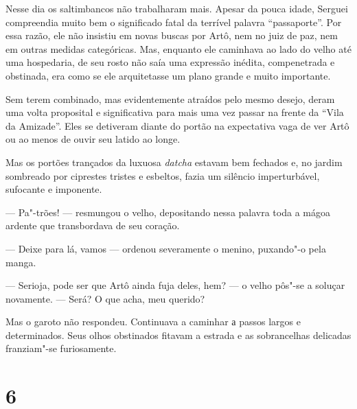 Nesse dia os saltimbancos não trabalharam mais. Apesar da pouca idade,
Serguei compreendia muito bem o significado fatal da terrível palavra
``passaporte''. Por essa razão, ele não insistiu em novas buscas por
Artô, nem no juiz de paz, nem em outras medidas categóricas. Mas,
enquanto ele caminhava ao lado do velho até uma hospedaria, de seu rosto
não saía uma expressão inédita, compenetrada e obstinada, era como se
ele arquitetasse um plano grande e muito importante.

Sem terem combinado, mas evidentemente atraídos pelo mesmo desejo, deram
uma volta proposital e significativa para mais uma vez passar na frente
da ``Vila da Amizade''. Eles se detiveram diante do portão na
expectativa vaga de ver Artô ou ao menos de ouvir seu latido ao longe.

Mas os portões trançados da luxuosa \emph{datcha} estavam bem fechados
e, no jardim sombreado por ciprestes tristes e esbeltos, fazia um
silêncio imperturbável, sufocante e imponente.

--- Pa"-trões! --- resmungou o velho, depositando nessa palavra toda a
mágoa ardente que transbordava de seu coração.

--- Deixe para lá, vamos --- ordenou severamente o menino, puxando"-o
pela manga.

--- Serioja, pode ser que Artô ainda fuja deles, hem? --- o velho pôs"-se
a soluçar novamente. --- Será? O que acha, meu querido?

Mas o garoto não respondeu. Continuava a caminhar а passos largos e
determinados. Seus olhos obstinados fitavam a estrada e as sobrancelhas
delicadas franziam"-se furiosamente.

\section{6}


